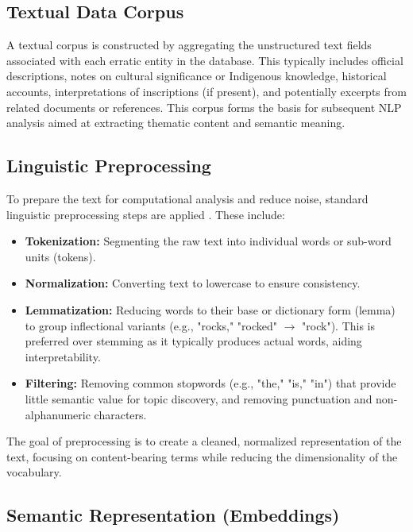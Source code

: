 \subsection{Textual Data Corpus}
\label{subsec:corpus}

A textual corpus is constructed by aggregating the unstructured text fields associated with each erratic entity in the database. This typically includes official descriptions, notes on cultural significance or Indigenous knowledge, historical accounts, interpretations of inscriptions (if present), and potentially excerpts from related documents or references. This corpus forms the basis for subsequent NLP analysis aimed at extracting thematic content and semantic meaning.

\subsection{Linguistic Preprocessing}
\label{subsec:preprocessing}

To prepare the text for computational analysis and reduce noise, standard linguistic preprocessing steps are applied \cite{Manning2008, Jurafsky2009}. These include:
\begin{itemize}
    \item \textbf{Tokenization:} Segmenting the raw text into individual words or sub-word units (tokens).
    \item \textbf{Normalization:} Converting text to lowercase to ensure consistency.
    \item \textbf{Lemmatization:} Reducing words to their base or dictionary form (lemma) to group inflectional variants (e.g., "rocks," "rocked" $\rightarrow$ "rock"). This is preferred over stemming as it typically produces actual words, aiding interpretability.
    \item \textbf{Filtering:} Removing common stopwords (e.g., "the," "is," "in") that provide little semantic value for topic discovery, and removing punctuation and non-alphanumeric characters.
\end{itemize}
The goal of preprocessing is to create a cleaned, normalized representation of the text, focusing on content-bearing terms while reducing the dimensionality of the vocabulary.

\subsection{Semantic Representation (Embeddings)}
\label{subsec:embeddings}


